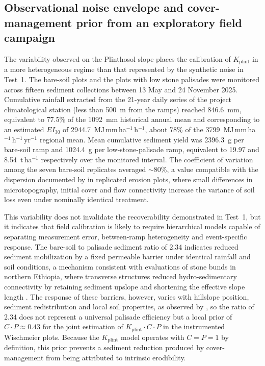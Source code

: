 \documentclass[preprint,review,12pt,authoryear]{elsarticle}
\begin{document}
\subsection{Observational noise envelope and cover-management prior from an exploratory field campaign}
\label{sec:empirical-anchor}

The variability observed on the Plinthosol slope places the calibration of $K_{\mathrm{plint}}$ in a more heterogeneous regime than that represented by the synthetic noise in Test~1. The bare-soil plots and the plots with low stone palisades were monitored across fifteen sediment collections between 13 May and 24 November 2025. Cumulative rainfall extracted from the 21-year daily series of the project climatological station (less than 500~m from the ramps) reached 846.6~mm, equivalent to 77.5\% of the 1092~mm historical annual mean and corresponding to an estimated $EI_{30}$ of 2944.7~MJ\,mm\,ha$^{-1}$\,h$^{-1}$, about 78\% of the 3799~MJ\,mm\,ha$^{-1}$\,h$^{-1}$\,yr$^{-1}$ regional mean. Mean cumulative sediment yield was 2396.3~g per bare-soil ramp and 1024.4~g per low-stone-palisade ramp, equivalent to 19.97 and 8.54~t\,ha$^{-1}$ respectively over the monitored interval. The coefficient of variation among the seven bare-soil replicates averaged $\sim$80\%, a value compatible with the dispersion documented by \citet{nearing_govers_norton_1999} in replicated erosion plots, where small differences in microtopography, initial cover and flow connectivity increase the variance of soil loss even under nominally identical treatment.

This variability does not invalidate the recoverability demonstrated in Test~1, but it indicates that field calibration is likely to require hierarchical models capable of separating measurement error, between-ramp heterogeneity and event-specific response. The bare-soil to palisade sediment ratio of 2.34 indicates reduced sediment mobilization by a fixed permeable barrier under identical rainfall and soil conditions, a mechanism consistent with evaluations of stone bunds in northern Ethiopia, where transverse structures reduced hydro-sedimentary connectivity by retaining sediment upslope and shortening the effective slope length \citep{nyssen_et_al_2007}. The response of these barriers, however, varies with hillslope position, sediment redistribution and local soil properties, as observed by \citet{vancampenhout_et_al_2006}, so the ratio of 2.34 does not represent a universal palisade efficiency but a local prior of $C \cdot P \approx 0.43$ for the joint estimation of $K_{\mathrm{plint}} \cdot C \cdot P$ in the instrumented Wischmeier plots. Because the $K_{\mathrm{plint}}$ model operates with $C = P = 1$ by definition, this prior prevents a sediment reduction produced by cover-management from being attributed to intrinsic erodibility.
\end{document}
